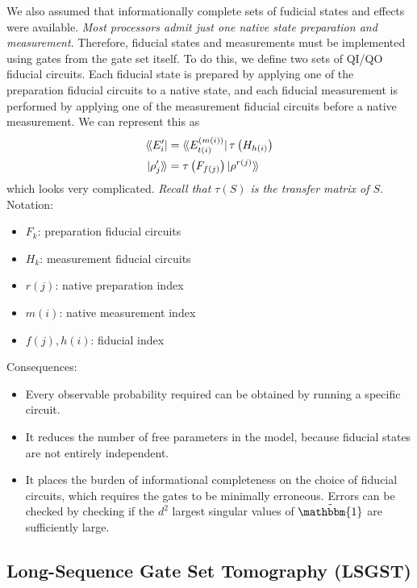 We also assumed that informationally complete sets of fudicial states and effects were available.
\textit{Most processors admit just one native state preparation and measurement}. Therefore,
fiducial states and measurements must be implemented using gates from the gate set itself. To do
this, we define two sets of QI/QO fiducial circuits. Each fiducial state is prepared by applying one
of the preparation fiducial circuits to a native state, and each fiducial measurement is performed
by applying one of the measurement fiducial circuits before a native measurement. We can represent
this as
\begin{align}
    \langle\!\bra{E_i'}    &= \langle\!\bra{E_{t(i)}^{(m(i))}} \tau \left(H_{h(i)}\right) \\
    \ket{\rho_j'}\!\rangle &= \tau \left(F_{f(j)}\right) \ket{\rho^{r(j)}}\!\rangle
\end{align}
which looks very complicated. \textit{Recall that $\tau(S)$ is the transfer matrix of $S$}.
Notation:
\begin{itemize}
    \item $F_k$: preparation fiducial circuits
    \item $H_k$: measurement fiducial circuits
    \item $r(j)$: native preparation index
    \item $m(i)$: native measurement index
    \item $f(j), h(i)$: fiducial index
\end{itemize}
Consequences:
\begin{itemize}
    \item Every observable probability required can be obtained by running a specific circuit.
    \item It reduces the number of free parameters in the model, because fiducial states are not
    entirely independent.
    \item It places the burden of informational completeness on the choice of fiducial circuits,
    which requires the gates to be minimally erroneous. Errors can be checked by checking if the
    $d^2$ largest singular values of $\tilde{\mathbbm{1}}$ are sufficiently large.
\end{itemize}

\subsection{Long-Sequence Gate Set Tomography (LSGST)}



